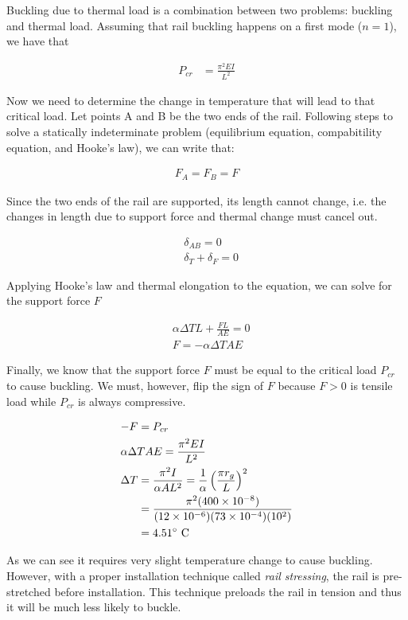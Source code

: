 \documentclass[
10pt,
a4paper,
openany,
svgnames,
]{book}
\begin{document}
\begin{solution}

  Buckling due to thermal load is a combination between two problems: buckling and thermal load. Assuming that rail buckling happens on a first mode ($n = 1$), we have that

  \begin{align*}
    P_{cr} &= \frac{ \pi^2 EI }{ L^2 } 
  \end{align*}

  Now we need to determine the change in temperature that will lead to that critical load. Let points A and B be the two ends of the rail. Following steps to solve a statically indeterminate problem (equilibrium equation, compabitility equation, and Hooke's law), we can write that:

  \begin{align*}
    F_A = F_B = F
  \end{align*}

  Since the two ends of the rail are supported, its length cannot change, i.e. the changes in length due to support force and thermal change must cancel out.

  \begin{align*}
    &\delta_{AB} = 0 \\
    &\delta_T + \delta_F = 0
  \end{align*}

  Applying Hooke's law and thermal elongation to the equation, we can solve for the support force $F$

  \begin{align*}
    &\alpha \Delta T L + \frac {FL}{AE} = 0 \\
    &F = -\alpha \Delta T A E
  \end{align*}

  Finally, we know that the support force $F$ must be equal to the critical load $P_{cr}$ to cause buckling. We must, however, flip the sign of $F$ because $F > 0$ is tensile load while $P_{cr}$ is always compressive.

  \begin{gather*}
    -F = P_{cr} \hfill \\
    \alpha \Delta T A E = \frac{ \pi^2 EI }{ L^2 } \hfill \\
    \begin{aligned}
      \Delta T &= \frac{ \pi^2 I }{ \alpha A L^2} = \frac{1}{\alpha} \left( \frac{ \pi r_g }{L} \right)^2 \\
      &= \frac{ \pi^2 (400 \times 10^{-8}) }{ (12 \times 10^{-6})(73 \times 10^{-4})(10^2)}\\
      &= 4.51^{\circ} \text{ C}
     \end{aligned}
  \end{gather*}

  As we can see it requires very slight temperature change to cause buckling. However, with a proper installation technique called \emph{rail stressing}, the rail is pre-stretched before installation. This technique preloads the rail in tension and thus it will be much less likely to buckle.
\end{solution}
\end{document}
